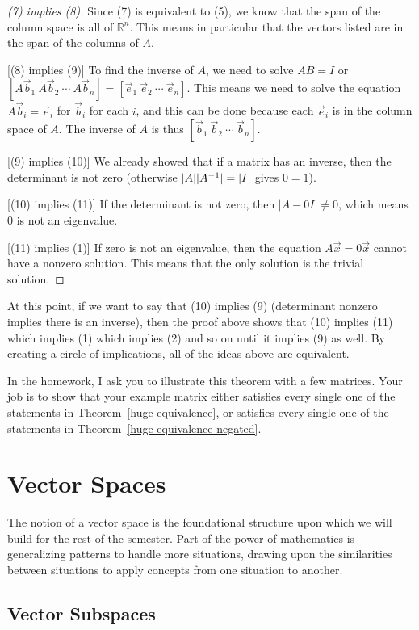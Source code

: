 \begin{proof}
[(7) implies (8)] Since (7) is equivalent to (5), we know that the span of the column space is all of ${\mathbb{R}}^n$. This means in particular that the vectors listed are in the span of the columns of $A$.

[(8) implies (9)]  To find the inverse of $A$, we need to solve $A B = I$ or $[A\vec b_1\ A\vec b_2\ \cdots\ A\vec b_n]=[\vec e_1\ \vec e_2\ \cdots\ \vec e_n]$. This means we need to solve the equation $A\vec b_i=\vec e_i$ for $\vec b_i$ for each $i$, and this can be done because each $\vec e_i$ is in the column space of $A$. The inverse of $A$ is thus $[\vec b_1 \ \vec b_2\ \cdots\ \vec b_n]$.

[(9) implies (10)] We already showed that if a matrix has an inverse, then the determinant is not zero (otherwise $|A||A^{-1}|=|I|$ gives $0=1$).

[(10) implies (11)] If the determinant is not zero, then $|A-0 I|\neq 0$, which means $0$ is not an eigenvalue.

[(11) implies (1)] If zero is not an eigenvalue, then the equation $A\vec x = 0\vec x$ cannot have a nonzero solution. This means that the only solution is the trivial solution.  
\end{proof}

At this point, if we want to say that (10) implies (9) (determinant nonzero implies there is an inverse), then the proof above shows that (10) implies (11) which implies (1) which implies (2) and so on until it implies (9) as well.  By creating a circle of implications, all of the ideas above are equivalent.


In the homework, I ask you to illustrate this theorem with a few matrices.  Your job is to show that your example matrix either satisfies every single one of the statements in Theorem~\ref{huge equivalence}, or satisfies every single one of the statements in Theorem~\ref{huge equivalence negated}.


\section{Vector Spaces}

The notion of a vector space is the foundational structure upon which we will build for the rest of the semester.  Part of the power of mathematics is generalizing patterns to handle more situations, drawing upon the similarities between situations to apply concepts from one situation to another.

\subsection{Vector Subspaces}

